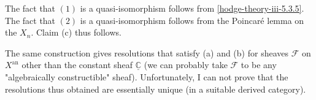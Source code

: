   \par{}The fact that \((1)\) is a quasi-isomorphism follows from \cref{hodge-theory-iii-5.3.5}.
    The fact that \((2)\) is a quasi-isomorphism follows from the Poincaré lemma on the \(X_n\).
    Claim (c) thus follows.\label{hodge-theory-iii-9.3.4}\par{}The same construction gives resolutions that satisfy (a) and (b) for sheaves \(\mathscr {F}\) on \(X^\mathrm {an}\) other than the constant sheaf \(\underline {\mathbb {C}}\) (we can probably take \(\mathscr {F}\) to be any "algebraically constructible" sheaf).
    Unfortunately, I can not prove that the resolutions thus obtained are essentially unique (in a suitable derived category).
